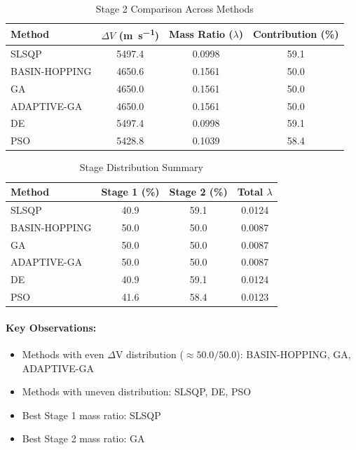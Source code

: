 \documentclass{article}
\begin{document}
\begin{table}[H]
\centering
\caption{Stage 2 Comparison Across Methods}
\begin{tabular}{lS[table-format=4.1]S[table-format=1.4]S[table-format=3.1]}
\toprule
Method & {$\Delta V$ (\si{\meter\per\second})} & {Mass Ratio ($\lambda$)} & {Contribution (\%)} \\
\midrule
SLSQP        & 5497.4 & 0.0998 & 59.1 \\
BASIN-HOPPING & 4650.6 & 0.1561 & 50.0 \\
GA           & 4650.0 & 0.1561 & 50.0 \\
ADAPTIVE-GA  & 4650.0 & 0.1561 & 50.0 \\
DE           & 5497.4 & 0.0998 & 59.1 \\
PSO          & 5428.8 & 0.1039 & 58.4 \\
\bottomrule
\end{tabular}
\end{table}

\begin{table}[H]
\centering
\caption{Stage Distribution Summary}
\begin{tabular}{lS[table-format=4.1]S[table-format=4.1]S[table-format=1.4]}
\toprule
Method & {Stage 1 (\%)} & {Stage 2 (\%)} & {Total $\lambda$} \\
\midrule
SLSQP        & 40.9 & 59.1 & 0.0124 \\
BASIN-HOPPING & 50.0 & 50.0 & 0.0087 \\
GA           & 50.0 & 50.0 & 0.0087 \\
ADAPTIVE-GA  & 50.0 & 50.0 & 0.0087 \\
DE           & 40.9 & 59.1 & 0.0124 \\
PSO          & 41.6 & 58.4 & 0.0123 \\
\bottomrule
\end{tabular}
\end{table}

\paragraph{Key Observations:}
\begin{itemize}
\item Methods with even $\Delta$V distribution ($\approx50.0/50.0$): BASIN-HOPPING, GA, ADAPTIVE-GA
\item Methods with uneven distribution: SLSQP, DE, PSO
\item Best Stage 1 mass ratio: SLSQP
\item Best Stage 2 mass ratio: GA
\end{itemize}
\end{document}
